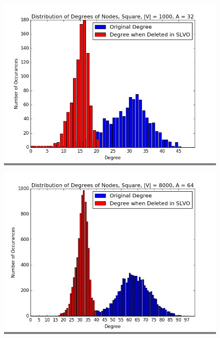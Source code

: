 \documentclass{article}
\begin{document}
\begin{figure}
    \begin{minipage}{0.3\textwidth}
    \colorbox{gray}{\includegraphics[width=\linewidth]{./graphs/hist_deg_del_square_0.png}}
    \end{minipage}
    \hspace{\fill}
    \begin{minipage}{0.3\textwidth}
    \colorbox{gray}{\includegraphics[width=\linewidth]{./graphs/hist_deg_del_square_1.png}}
    \end{minipage}
    \hspace{\fill}
    \begin{minipage}{0.3\textwidth}

\end{minipage}
\end{figure}
\end{document}

